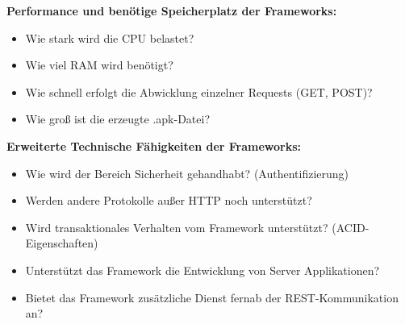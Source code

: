 \textbf{Performance und benötige Speicherplatz der Frameworks:}
\begin{itemize}
	\item Wie stark wird die CPU belastet?  
	\item Wie viel RAM wird benötigt? 
	\item Wie schnell erfolgt die Abwicklung einzelner Requests (GET, POST)?
	\item Wie groß ist die erzeugte .apk-Datei?	
\end{itemize}
\newpage
\textbf{Erweiterte Technische Fähigkeiten der Frameworks:}
\begin{itemize}
	\item Wie wird der Bereich Sicherheit gehandhabt?  (Authentifizierung)
	\item Werden andere Protokolle außer HTTP noch unterstützt?	
	\item Wird transaktionales Verhalten vom Framework unterstützt? (ACID-Eigenschaften)
	\item Unterstützt das Framework die Entwicklung von Server Applikationen?
	\item Bietet das Framework zusätzliche Dienst fernab der REST-Kommunikation an?
\end{itemize}
